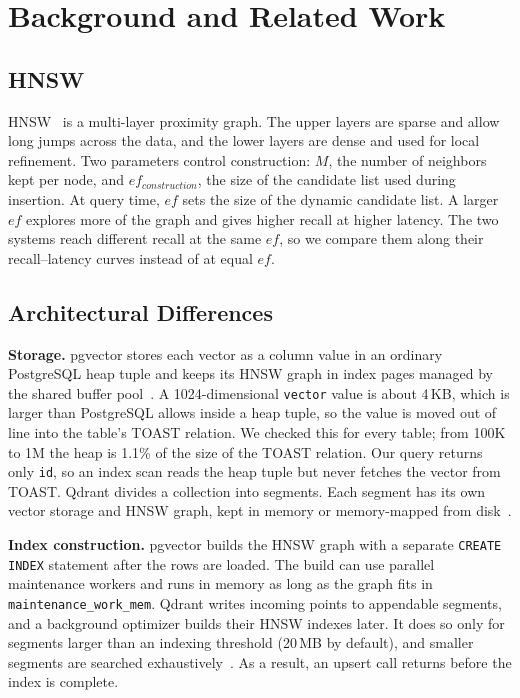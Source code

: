 \documentclass[preprint,12pt]{elsarticle}
\begin{document}
\section{Background and Related Work}

\subsection{HNSW}

HNSW~\cite{malkov2018} is a multi-layer proximity graph. The upper layers are sparse
and allow long jumps across the data, and the lower layers are dense and used for local
refinement. Two parameters control construction: $M$, the number of neighbors kept per
node, and $ef_{construction}$, the size of the candidate list used during insertion.
At query time, $ef$ sets the size of the dynamic candidate list. A larger $ef$ explores
more of the graph and gives higher recall at higher latency. The two systems reach
different recall at the same $ef$, so we compare them along their recall--latency curves
instead of at equal $ef$.

\subsection{Architectural Differences}

\textbf{Storage.} pgvector stores each vector as a column value in an ordinary
PostgreSQL heap tuple and keeps its HNSW graph in index pages managed by the shared
buffer pool~\cite{pgvector,postgres_docs}. A 1024-dimensional \texttt{vector} value is
about 4\,KB, which is larger than PostgreSQL allows inside a heap tuple, so the value is
moved out of line into the table's TOAST relation. We checked this for every table; from
100K to 1M the heap is 1.1\% of the size of the TOAST relation. Our query returns only
\texttt{id}, so an index scan reads the heap tuple but never fetches the vector from
TOAST. Qdrant divides a collection into segments. Each segment has its own vector
storage and HNSW graph, kept in memory or memory-mapped from disk~\cite{qdrant}.

\textbf{Index construction.} pgvector builds the HNSW graph with a separate
\texttt{CREATE INDEX} statement after the rows are loaded. The build can use parallel
maintenance workers and runs in memory as long as the graph fits in
\texttt{maintenance\_work\_mem}. Qdrant writes incoming points to appendable segments,
and a background optimizer builds their HNSW indexes later. It does so only for
segments larger than an indexing threshold (20\,MB by default), and smaller segments
are searched exhaustively~\cite{qdrant}. As a result, an upsert call returns before the
index is complete.
\end{document}
